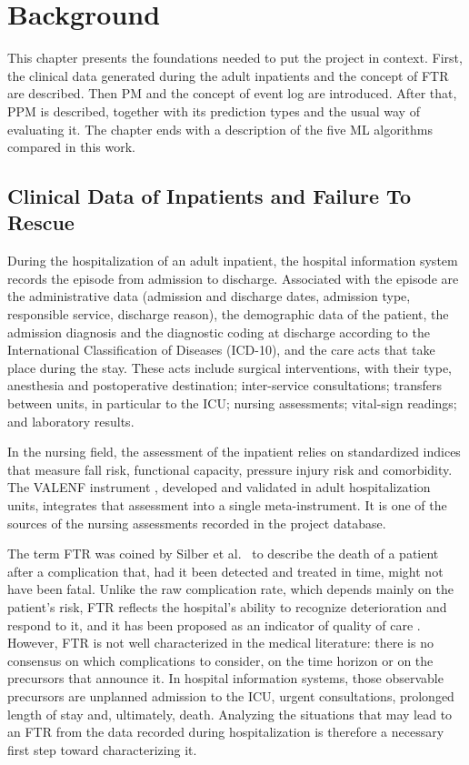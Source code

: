 \chapter{Background}
\label{cap:background}

This chapter presents the foundations needed to put the project in context. First, the clinical data generated during the adult inpatients and the concept of FTR are described. Then PM and the concept of event log are introduced. After that, PPM is described, together with its prediction types and the usual way of evaluating it. The chapter ends with a description of the five ML algorithms compared in this work.

\section{Clinical Data of Inpatients and Failure To Rescue}
\label{sec:datos_clinicos}

During the hospitalization of an adult inpatient, the hospital information system records the episode from admission to discharge. Associated with the episode are the administrative data (admission and discharge dates, admission type, responsible service, discharge reason), the demographic data of the patient, the admission diagnosis and the diagnostic coding at discharge according to the International Classification of Diseases (ICD-10), and the care acts that take place during the stay. These acts include surgical interventions, with their type, anesthesia and postoperative destination; inter-service consultations; transfers between units, in particular to the ICU; nursing assessments; vital-sign readings; and laboratory results.

In the nursing field, the assessment of the inpatient relies on standardized indices that measure fall risk, functional capacity, pressure injury risk and comorbidity. The VALENF instrument \cite{lunaaleixos2022}, developed and validated in adult hospitalization units, integrates that assessment into a single meta-instrument. It is one of the sources of the nursing assessments recorded in the project database.

The term FTR was coined by Silber et al.\ \cite{silber1992} to describe the death of a patient after a complication that, had it been detected and treated in time, might not have been fatal. Unlike the raw complication rate, which depends mainly on the patient's risk, FTR reflects the hospital's ability to recognize deterioration and respond to it, and it has been proposed as an indicator of quality of care \cite{ghaferi2009}. However, FTR is not well characterized in the medical literature: there is no consensus on which complications to consider, on the time horizon or on the precursors that announce it. In hospital information systems, those observable precursors are unplanned admission to the ICU, urgent consultations, prolonged length of stay and, ultimately, death. Analyzing the situations that may lead to an FTR from the data recorded during hospitalization is therefore a necessary first step toward characterizing it.


